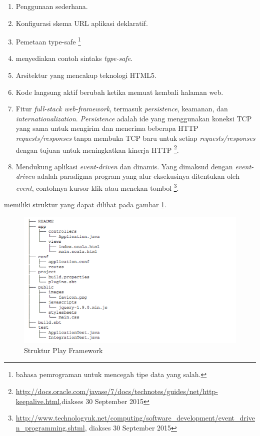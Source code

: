 \begin{enumerate}
	\item Penggunaan \play sederhana.
	\item Konfigurasi skema URL aplikasi deklaratif.
	\item Pemetaan type-safe \footnote{bahasa pemrograman untuk mencegah tipe data yang salah.}
	\item \play menyediakan contoh sintaks \textit{type-safe}.
	\item Arsitektur yang mencakup teknologi HTML5.
	\item Kode langsung aktif berubah ketika memuat kembali halaman web.
	\item Fitur \textit{full-stack web-framework}, termasuk \textit{persistence}, keamanan, dan \textit{internationalization}. \textit{Persistence} adalah ide yang menggunakan koneksi TCP yang sama untuk mengirim dan menerima beberapa HTTP \textit{requests/responses} tanpa membuka TCP baru untuk setiap \textit{requests/responses} dengan tujuan untuk meningkatkan kinerja HTTP \footnote{ \url{http://docs.oracle.com/javase/7/docs/technotes/guides/net/http-keepalive.html},diakses 30 September 2015}.
	\item Mendukung aplikasi \textit{event-driven} dan dinamis. Yang dimaksud dengan \textit{event-driven} adalah paradigma program yang alur eksekusinya ditentukan oleh \textit{event}, contohnya kursor klik atau menekan tombol \footnote{\url{http://www.technologyuk.net/computing/software_development/event_driven_programming.shtml}, diakses 30 September 2015}.
\end{enumerate}

\play memiliki struktur yang dapat dilihat pada gambar \ref{fig:2_play_struktur}.

\begin{figure}[H]
	\centering
	\includegraphics[scale=0.7]{Gambar/play-struktur}
	\caption{Struktur Play Framework} 
	\label{fig:2_play_struktur}
\end{figure}

